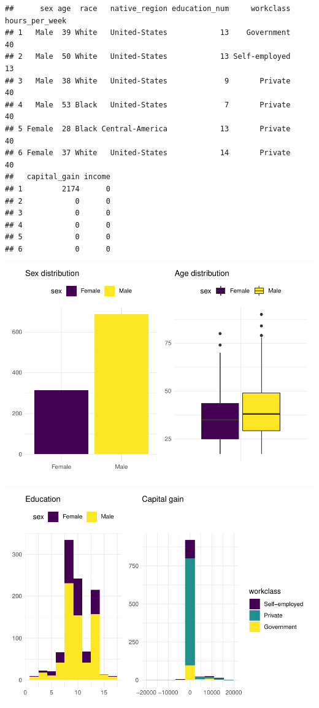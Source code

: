 \documentclass[
]{article}
\begin{document}
\begin{verbatim}
##      sex age  race   native_region education_num     workclass hours_per_week
## 1   Male  39 White   United-States            13    Government             40
## 2   Male  50 White   United-States            13 Self-employed             13
## 3   Male  38 White   United-States             9       Private             40
## 4   Male  53 Black   United-States             7       Private             40
## 5 Female  28 Black Central-America            13       Private             40
## 6 Female  37 White   United-States            14       Private             40
##   capital_gain income
## 1         2174      0
## 2            0      0
## 3            0      0
## 4            0      0
## 5            0      0
## 6            0      0
\end{verbatim}

\includegraphics{bmp_main_files/figure-latex/sex_age plots-1.pdf}

\includegraphics{bmp_main_files/figure-latex/edu_cap plots-1.pdf}
\end{document}
